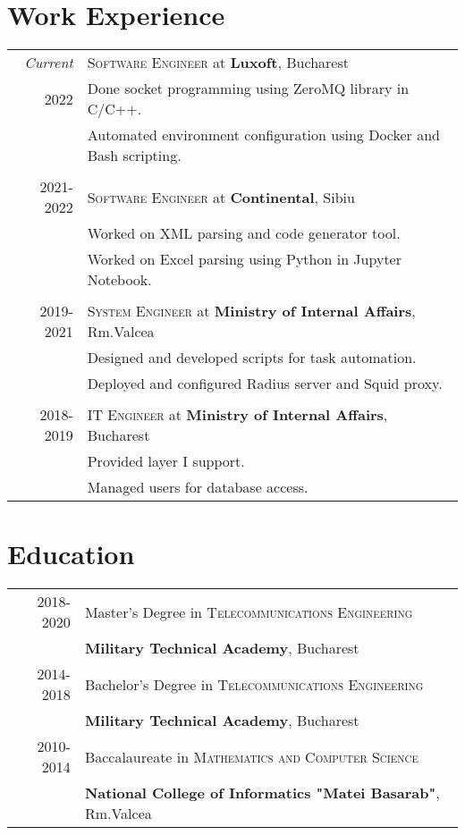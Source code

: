 \documentclass[a4paper,10pt]{article}
\begin{document}
\section{Work Experience}
\begin{tabular}{r|p{11cm}}

\emph{Current}
&\textsc{Software Engineer} at \textbf{Luxoft}, Bucharest\\
\textsc{2022}
&\footnotesize{Done socket programming using ZeroMQ library in C/C++.}\\
&\footnotesize{Automated environment configuration using Docker and Bash scripting.}\\
\multicolumn{2}{c}{}\\
\textsc{2021-2022}
&\textsc{Software Engineer} at \textbf{Continental}, Sibiu\\
&\footnotesize{Worked on XML parsing and code generator tool.}\\
&\footnotesize{Worked on Excel parsing using Python in Jupyter Notebook.}\\
\multicolumn{2}{c}{}\\
\textsc{2019-2021} 
  &\textsc{System Engineer} at \textbf{Ministry of Internal Affairs}, Rm.Valcea\\
&\footnotesize{
  Designed and developed scripts for task automation.}\\
&\footnotesize{
  Deployed and configured Radius server and Squid proxy.}\\
\multicolumn{2}{c}{}\\
\textsc{2018-2019} 
&\textsc{IT Engineer} at \textbf{Ministry of Internal Affairs}, Bucharest\\
&\footnotesize{Provided layer I support.}\\
&\footnotesize{Managed users for database access.}\\
\end{tabular}

\section{Education}
\begin{tabular}{rl}
\textsc{2018-2020}&Master's Degree in 
  \textsc{Telecommunications Engineering}\\
  &\textbf{Military Technical Academy}, Bucharest\\
\textsc{2014-2018}&Bachelor's Degree in
  \textsc{Telecommunications Engineering}\\
  &\textbf{Military Technical Academy}, Bucharest\\
\textsc{2010-2014}&Baccalaureate in 
  \textsc{Mathematics and Computer Science}\\
  &\textbf{National College of Informatics "Matei Basarab"}, Rm.Valcea\\
\end{tabular}
\end{document}
